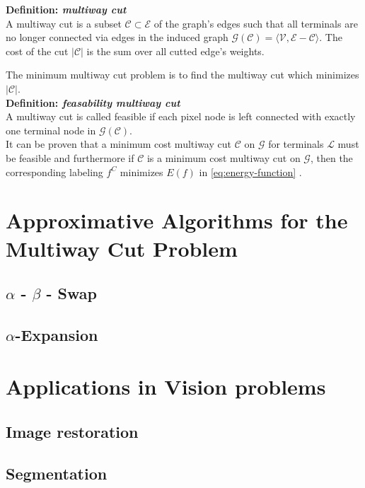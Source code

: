 \documentclass{scrartcl}[12pt, halfparskip]
\begin{document}
\textbf{Definition: \textit{multiway cut}}\\
A multiway cut is a subset $\mathcal{C} \subset \mathcal{E}$ of the graph's edges such that all terminals are no longer connected via edges in the induced graph $\mathcal{G}(\mathcal{C}) = \langle \mathcal{V}, \mathcal{E} - \mathcal{C}\rangle$. The cost of the cut $|\mathcal{C}|$ is the sum over all cutted edge's weights. 

The minimum multiway cut problem is to find the multiway cut which minimizes $|\mathcal{C}|$. \\

\textbf{Definition: \textit{feasability multiway cut}}\\
A multiway cut is called feasible if each pixel node is left connected with exactly one terminal node in $\mathcal{G}(\mathcal{C})$. \\


It can be proven that a minimum cost multiway cut $\mathcal{C}$ on $\mathcal{G}$ for terminals $\mathcal{L}$ must be feasible \cite{boykov98} and furthermore if $\mathcal{C}$ is a minimum cost multiway cut on $\mathcal{G}$, then the corresponding labeling $f^C$ minimizes $E(f)$ in \eqref{eq:energy-function} \cite{boykov98}.





\section{Approximative Algorithms for the Multiway Cut Problem}
\subsection{$\alpha$ - $\beta$ - Swap}
\subsection{$\alpha$-Expansion}

\section{Applications in Vision problems}
\subsection{Image restoration}
\subsection{Segmentation}
\end{document}
